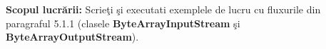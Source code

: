 \textbf{Scopul lucr\u{a}rii:} Scrie\c{t}i \c{s}i executati exemplele de lucru cu fluxurile
din paragraful 5.1.1 (clasele \textbf{ByteArrayInputStream} \c{s}i \textbf{ByteArrayOutputStream}).


